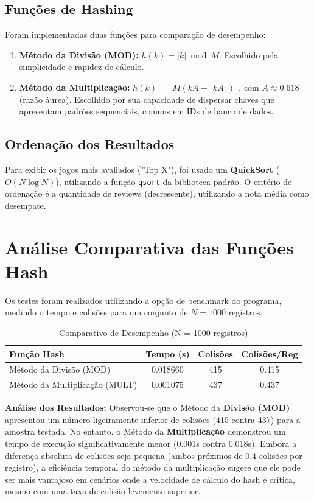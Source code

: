 \documentclass[11pt, a4paper]{article}
\begin{document}
\subsection{Funções de Hashing}
Foram implementadas duas funções para comparação de desempenho:
\begin{enumerate}
    \item \textbf{Método da Divisão (MOD):} $h(k) = |k| \bmod M$. Escolhido pela simplicidade e rapidez de cálculo.
    \item \textbf{Método da Multiplicação:} $h(k) = \lfloor M (k A - \lfloor k A \rfloor) \rfloor$, com $A \approx 0.618$ (razão áurea). Escolhido por sua capacidade de dispersar chaves que apresentam padrões sequenciais, comuns em IDs de banco de dados.
\end{enumerate}

\subsection{Ordenação dos Resultados}
Para exibir os jogos mais avaliados ("Top X"), foi usado um \textbf{QuickSort} ($O(N \log N)$), utilizando a função \texttt{qsort} da biblioteca padrão. O critério de ordenação é a quantidade de reviews (decrescente), utilizando a nota média como desempate.

\section{Análise Comparativa das Funções Hash}

Os testes foram realizados utilizando a opção de benchmark do programa, medindo o tempo e colisões para um conjunto de $N = 1000$ registros.

\begin{table}[H]
    \centering
    \caption{Comparativo de Desempenho (N = 1000 registros)}
    \begin{tabular}{@{}lccc@{}}
        \toprule
        \textbf{Função Hash} & \textbf{Tempo (s)} & \textbf{Colisões} & \textbf{Colisões/Reg} \\ \midrule
        Método da Divisão (MOD)      & 0.018660 & 415 & 0.415 \\
        Método da Multiplicação (MULT) & 0.001075 & 437 & 0.437 \\ \bottomrule
    \end{tabular}
    \label{tab:comparativo}
\end{table}

\textbf{Análise dos Resultados:}
Observou-se que o Método da \textbf{Divisão (MOD)} apresentou um número ligeiramente inferior de colisões (415 contra 437) para a amostra testada. No entanto, o Método da \textbf{Multiplicação} demonstrou um tempo de execução significativamente menor (0.001s contra 0.018s). Embora a diferença absoluta de colisões seja pequena (ambos próximos de 0.4 colisões por registro), a eficiência temporal do método da multiplicação sugere que ele pode ser mais vantajoso em cenários onde a velocidade de cálculo do hash é crítica, mesmo com uma taxa de colisão levemente superior.
\end{document}
